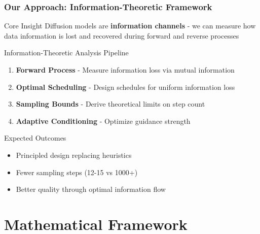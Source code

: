 \documentclass[aspectratio=169]{beamer}
\begin{document}
\begin{frame}
\frametitle{Our Approach: Information-Theoretic Framework}
\begin{block}{Core Insight}
Diffusion models are \textbf{information channels} - we can measure how data information is lost and recovered during forward and reverse processes
\end{block}

\vspace{0.5cm}
\begin{block}{Information-Theoretic Analysis Pipeline}
\begin{enumerate}
\item \textcolor{myblue}{\textbf{Forward Process}} - Measure information loss via mutual information
\item \textcolor{mygreen}{\textbf{Optimal Scheduling}} - Design schedules for uniform information loss
\item \textcolor{myred}{\textbf{Sampling Bounds}} - Derive theoretical limits on step count
\item \textcolor{mypurple}{\textbf{Adaptive Conditioning}} - Optimize guidance strength
\end{enumerate}
\end{block}

\vspace{0.5cm}
\begin{alertblock}{Expected Outcomes}
\begin{itemize}
\item \textcolor{mygreen}{Principled design} replacing heuristics
\item \textcolor{mygreen}{Fewer sampling steps} (12-15 vs 1000+)
\item \textcolor{mygreen}{Better quality} through optimal information flow
\end{itemize}
\end{alertblock}
\end{frame}

\section{Mathematical Framework}
\end{document}
